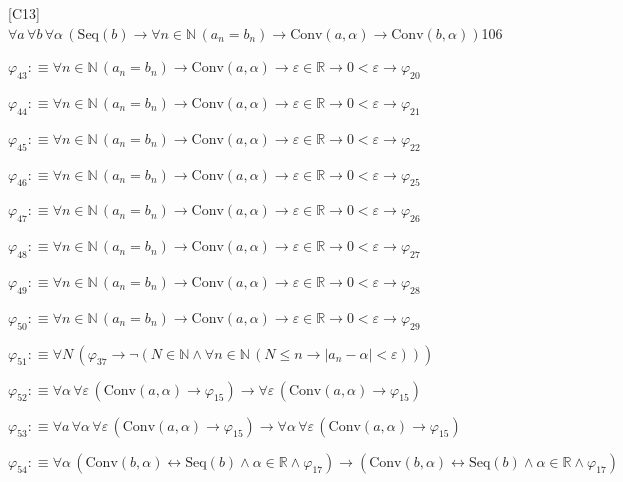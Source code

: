 \begin{fullproof}{[C13]}{$\forall a\,\forall b\,\forall \alpha\,(\mathrm{Seq}(b) \to \forall n \in \mathbb{N}\,(a_{n} = b_{n}) \to \mathrm{Conv}(a,\alpha) \to \mathrm{Conv}(b,\alpha))$}{106}
\begin{abbrevlist}
\item $\varphi_{43} :\equiv \forall n \in \mathbb{N}\,(a_{n} = b_{n}) \to \mathrm{Conv}(a,\alpha) \to \varepsilon \in \mathbb{R} \to 0 < \varepsilon \to \varphi_{20}$
\item $\varphi_{44} :\equiv \forall n \in \mathbb{N}\,(a_{n} = b_{n}) \to \mathrm{Conv}(a,\alpha) \to \varepsilon \in \mathbb{R} \to 0 < \varepsilon \to \varphi_{21}$
\item $\varphi_{45} :\equiv \forall n \in \mathbb{N}\,(a_{n} = b_{n}) \to \mathrm{Conv}(a,\alpha) \to \varepsilon \in \mathbb{R} \to 0 < \varepsilon \to \varphi_{22}$
\item $\varphi_{46} :\equiv \forall n \in \mathbb{N}\,(a_{n} = b_{n}) \to \mathrm{Conv}(a,\alpha) \to \varepsilon \in \mathbb{R} \to 0 < \varepsilon \to \varphi_{25}$
\item $\varphi_{47} :\equiv \forall n \in \mathbb{N}\,(a_{n} = b_{n}) \to \mathrm{Conv}(a,\alpha) \to \varepsilon \in \mathbb{R} \to 0 < \varepsilon \to \varphi_{26}$
\item $\varphi_{48} :\equiv \forall n \in \mathbb{N}\,(a_{n} = b_{n}) \to \mathrm{Conv}(a,\alpha) \to \varepsilon \in \mathbb{R} \to 0 < \varepsilon \to \varphi_{27}$
\item $\varphi_{49} :\equiv \forall n \in \mathbb{N}\,(a_{n} = b_{n}) \to \mathrm{Conv}(a,\alpha) \to \varepsilon \in \mathbb{R} \to 0 < \varepsilon \to \varphi_{28}$
\item $\varphi_{50} :\equiv \forall n \in \mathbb{N}\,(a_{n} = b_{n}) \to \mathrm{Conv}(a,\alpha) \to \varepsilon \in \mathbb{R} \to 0 < \varepsilon \to \varphi_{29}$
\item $\varphi_{51} :\equiv \forall N\,(\varphi_{37} \to \neg (N \in \mathbb{N} \land \forall n \in \mathbb{N}\,(N \leq n \to \lvert a_{n} - \alpha \rvert < \varepsilon)))$
\item $\varphi_{52} :\equiv \forall \alpha\,\forall \varepsilon\,(\mathrm{Conv}(a,\alpha) \to \varphi_{15}) \to \forall \varepsilon\,(\mathrm{Conv}(a,\alpha) \to \varphi_{15})$
\item $\varphi_{53} :\equiv \forall a\,\forall \alpha\,\forall \varepsilon\,(\mathrm{Conv}(a,\alpha) \to \varphi_{15}) \to \forall \alpha\,\forall \varepsilon\,(\mathrm{Conv}(a,\alpha) \to \varphi_{15})$
\item $\varphi_{54} :\equiv \forall \alpha\,(\mathrm{Conv}(b,\alpha) \leftrightarrow \mathrm{Seq}(b) \land \alpha \in \mathbb{R} \land \varphi_{17}) \to (\mathrm{Conv}(b,\alpha) \leftrightarrow \mathrm{Seq}(b) \land \alpha \in \mathbb{R} \land \varphi_{17})$

\end{abbrevlist}
\end{fullproof}
